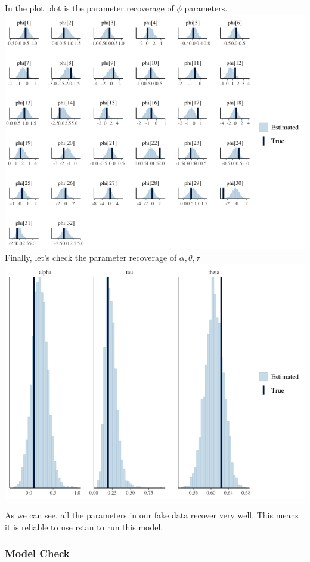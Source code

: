 \documentclass[]{tufte-handout}
\begin{document}
In the plot plot is the parameter recoverage of \(\phi\) parameters.
\includegraphics{./pic/Rplot.png} Finally, let's check the parameter
recoverage of \(\alpha,\theta,\tau\) \includegraphics{./pic/Rplot02.png}

As we can see, all the parameters in our fake data recover very well.
This means it is reliable to use rstan to run this model.

\hypertarget{model-check}{%
\subsubsection{Model Check}\label{model-check}}
\end{document}
